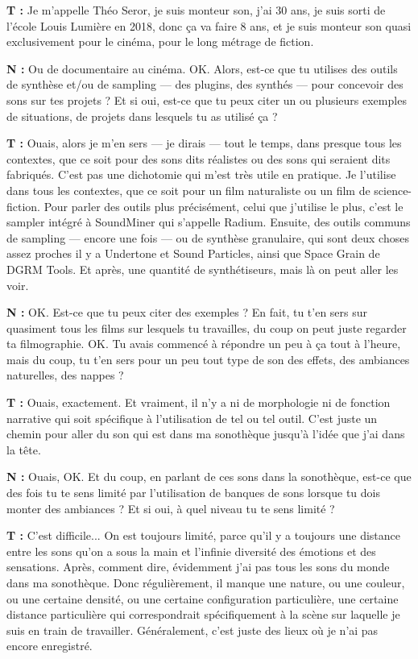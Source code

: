 ﻿\documentclass[12pt]{article}
\begin{document}
\textbf{T :} Je m'appelle Théo Seror, je suis monteur son, j'ai 30 ans, je suis sorti de l'école Louis Lumière en 2018, donc ça va faire 8 ans, et je suis monteur son quasi exclusivement pour le cinéma, pour le long métrage de fiction. 

\textbf{N :} Ou de documentaire au cinéma. OK. Alors, est-ce que tu utilises des outils de synthèse et/ou de sampling — des plugins, des synthés — pour concevoir des sons sur tes projets ? Et si oui, est-ce que tu peux citer un ou plusieurs exemples de situations, de projets dans lesquels tu as utilisé ça ? 

\textbf{T :} Ouais, alors je m'en sers — je dirais — tout le temps, dans presque tous les contextes, que ce soit pour des sons dits réalistes ou des sons qui seraient dits fabriqués. C'est pas une dichotomie qui m'est très utile en pratique. Je l'utilise dans tous les contextes, que ce soit pour un film naturaliste ou un film de science-fiction. Pour parler des outils plus précisément, celui que j'utilise le plus, c'est le sampler intégré à SoundMiner qui s'appelle Radium. Ensuite, des outils communs de sampling — encore une fois — ou de synthèse granulaire, qui sont deux choses assez proches il y a Undertone et Sound Particles, ainsi que Space Grain de DGRM Tools. Et après, une quantité de synthétiseurs, mais là on peut aller les voir. 

\textbf{N :} OK. Est-ce que tu peux citer des exemples ? En fait, tu t'en sers sur quasiment tous les films sur lesquels tu travailles, du coup on peut juste regarder ta filmographie. OK. Tu avais commencé à répondre un peu à ça tout à l'heure, mais du coup, tu t'en sers pour un peu tout type de son des effets, des ambiances naturelles, des nappes ? 

\textbf{T :} Ouais, exactement. Et vraiment, il n'y a ni de morphologie ni de fonction narrative qui soit spécifique à l'utilisation de tel ou tel outil. C'est juste un chemin pour aller du son qui est dans ma sonothèque jusqu'à l'idée que j'ai dans la tête. 

\textbf{N :} Ouais, OK. Et du coup, en parlant de ces sons dans la sonothèque, est-ce que des fois tu te sens limité par l'utilisation de banques de sons lorsque tu dois monter des ambiances ? Et si oui, à quel niveau tu te sens limité ? 

\textbf{T :} C'est difficile... On est toujours limité, parce qu'il y a toujours une distance entre les sons qu'on a sous la main et l'infinie diversité des émotions et des sensations. Après, comment dire, évidemment j'ai pas tous les sons du monde dans ma sonothèque. Donc régulièrement, il manque une nature, ou une couleur, ou une certaine densité, ou une certaine configuration particulière, une certaine distance particulière qui correspondrait spécifiquement à la scène sur laquelle je suis en train de travailler. Généralement, c'est juste des lieux où je n'ai pas encore enregistré. 
\end{document}
